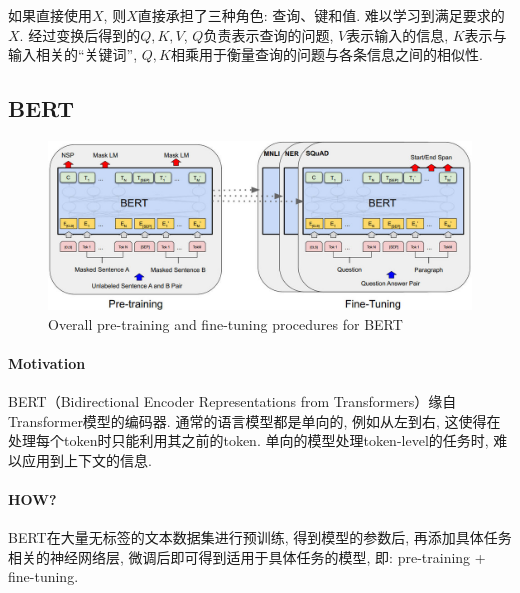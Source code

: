 如果直接使用$X$, 则$X$直接承担了三种角色: 查询、键和值. 难以学习到满足要求的$X$. 经过变换后得到的$Q, K, V$, $Q$负责表示查询的问题, $V$表示输入的信息, $K$表示与输入相关的“关键词”, $Q, K$相乘用于衡量查询的问题与各条信息之间的相似性. 

\subsection{BERT}
\begin{figure}[h] 
	\centering
	\includegraphics[width=.9\textwidth]{pics/bert-pre training-fine tunning.jpg}
	\caption{Overall pre-training and fine-tuning procedures for BERT}
	\label{fig:bert-pf}
\end{figure}

\paragraph{Motivation}
BERT（Bidirectional Encoder Representations from Transformers）\cite{devlin2019bert}缘自Transformer模型的编码器. 通常的语言模型都是单向的, 例如从左到右, 这使得在处理每个token时只能利用其之前的token. 单向的模型处理token-level的任务时, 难以应用到上下文的信息. 

\paragraph{HOW?}
BERT在大量无标签的文本数据集进行预训练, 得到模型的参数后, 再添加具体任务相关的神经网络层, 微调后即可得到适用于具体任务的模型, 即: pre-training + fine-tuning. 

